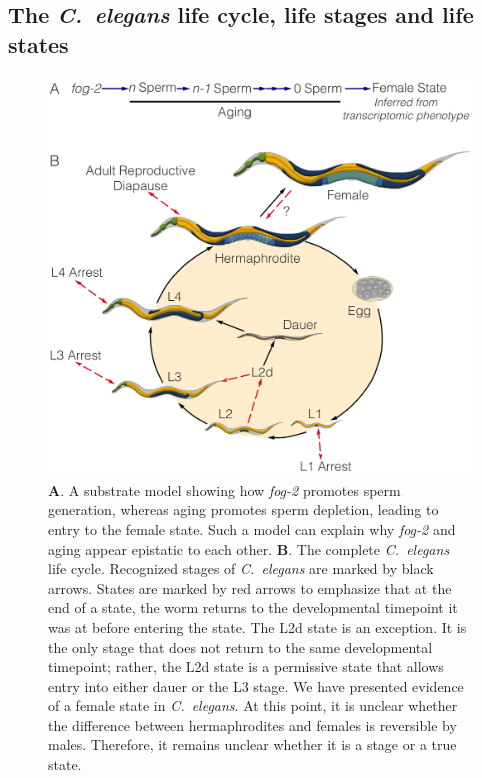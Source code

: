 \documentclass[10pt,letterpaper,twocolumn]{article}
\newcommand{\cel}{\emph{C.~elegans}}
\newcommand{\gene}[1]{\emph{\mbox{#1}}}
\begin{document}
\subsection*{The \cel{} life cycle, life stages and life states}

\begin{figure}
\renewcommand{\familydefault}{\sfdefault}\normalfont{}
\centering
\includegraphics[width=\linewidth]{../../output/figs/final_figs/c_elegans_life_cycle.pdf}
\caption{
\textbf{A}. A substrate model showing how \gene{fog-2} promotes sperm generation,
whereas aging promotes sperm depletion, leading to entry to the female state. Such
a model can explain why \gene{fog-2} and aging appear epistatic to each other.
\textbf{B}.
The complete \cel{} life cycle. Recognized stages of \cel{} are marked by black
arrows. States are marked by red arrows to emphasize that at the end of a state,
the worm returns to the developmental timepoint it was at before entering the
state. The L2d state is an exception. It is the only stage that does not return
to the same developmental timepoint; rather, the L2d state is a permissive state
that allows entry into either dauer or the L3 stage. We have presented evidence
of a female state in \cel{}. At this point, it is unclear whether the difference
between hermaphrodites and females is reversible by males. Therefore, it remains
unclear whether it is a stage or a true state.
}%
\label{fig:lifecycle}
\end{figure}
\end{document}
